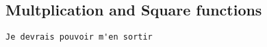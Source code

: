 \subsection{Multplication and Square functions}


\begin{verbatim}
Je devrais pouvoir m'en sortir
\end{verbatim}
